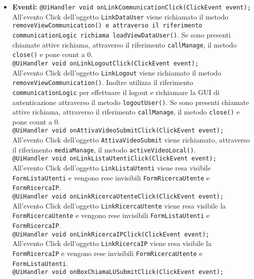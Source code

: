 {\begin{sloppypar}
{\begin{itemize}
\begin{itemize}
			\item[] \textbf{Eventi:}
				\texttt{@UiHandler void onLinkCommunicationClick(ClickEvent event);}\\
				All'evento Click dell'oggetto \texttt{LinkDataUser} viene richiamato il metodo \texttt{removeViewCommunication() e attraverso il riferimento communicationLogic richiama loadViewDataUser()}. 
				Se sono presenti chiamate attive richiama, attraverso il riferimento \texttt{callManage}, il metodo \texttt{close()} e pone count a 0.\\
				\texttt{@UiHandler void onLinkLogoutClick(ClickEvent event);}\\
				All'evento Click dell'oggetto \texttt{LinkLogout} viene richiamato il metodo
				\texttt{removeViewCommunication()}. Inoltre utilizza il riferimento \texttt{communicationLogic} per 
				effettuare il logout e richiamare la GUI di autenticazione attraverso il metodo \texttt{logoutUser()}. 
				Se sono presenti chiamate attive richiama, attraverso il riferimento \texttt{callManage}, il metodo 
				\texttt{close()} e pone count a 0.\\
				\texttt{@UiHandler void onAttivaVideoSubmitClick(ClickEvent event);}\\
				All’evento Click dell’oggetto \texttt{AttivaVideoSubmit} viene richiamato, attraverso il riferimento 
				\texttt{mediaManage}, il metodo \texttt{activeVideoLocal()}.\\
				\texttt{@UiHandler void onLinkListaUtentiClick(ClickEvent event);}\\
				All'evento Click dell'oggetto \texttt{LinkListaUtenti} viene resa visibile \texttt{FormListaUtenti} e 
				vengono rese invisibili \texttt{FormRicercaUtente} e \texttt{FormRicercaIP}.\\
				\texttt{@UiHandler void onLinkRicercaUtenteClick(ClickEvent event);}\\
				All'evento Click dell'oggetto \texttt{LinkRicercaUtente} viene resa visibile la \texttt{FormRicercaUtente} 
				e vengono rese invisibili \texttt{FormListaUtenti} e \texttt{FormRicercaIP}.\\
				\texttt{@UiHandler void onLinkRicercaIPClick(ClickEvent event);}\\
				All'evento Click dell'oggetto \texttt{LinkRicercaIP} viene resa visibile la \texttt{FormRicercaIP} e 
				vengono rese invisibili \texttt{FormRicercaUtente} e \texttt{FormListaUtenti}.\\
				\texttt{@UiHandler void onBoxChiamaLUSubmitClick(ClickEvent event);}\\

\end{itemize}
\end{itemize}}
\end{sloppypar}}
